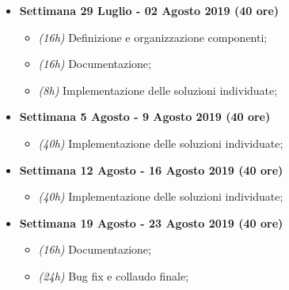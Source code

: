 {\begin{itemize}
\begin{itemize}
        \end{itemize}
        \item \textbf{Settimana \textbf{29 Luglio - 02 Agosto 2019} (40 ore)} 
        \begin{itemize}
            \item \textit{(16h)} Definizione e organizzazione componenti;
            \item \textit{(16h)} Documentazione;
            \item \textit{(8h)} Implementazione delle soluzioni individuate;
        \end{itemize}
        \item \textbf{Settimana \textbf{5 Agosto - 9 Agosto 2019} (40 ore)} 
        \begin{itemize}
            \item \textit{(40h)} Implementazione delle soluzioni individuate;
        \end{itemize}
        \item \textbf{Settimana \textbf{12 Agosto - 16 Agosto 2019} (40 ore)} 
        \begin{itemize}
            \item \textit{(40h)} Implementazione delle soluzioni individuate;
        \end{itemize}
        \item \textbf{Settimana \textbf{19 Agosto - 23 Agosto 2019} (40 ore)} 
        \begin{itemize}
            \item \textit{(16h)} Documentazione;
            \item \textit{(24h)} Bug fix e collaudo finale;
        \end{itemize}
    \end{itemize}
}

\newcommand{\totaleOre}{320}

\newcommand{\obiettiviObbligatori}{
	 \item \underline{\textit{O01}}: Realizzazione del componente "Hydrogen Custom Logon" per \textit{MacOs Mojave};
	 \item \underline{\textit{O02}}: Realizzazione di un installer del componente per \textit{MacOs Mojave};
	 \item \underline{\textit{O03}}: Documentazione di progetto;
	 
}

\newcommand{\obiettiviDesiderabili}{
	 \item \underline{\textit{D01}}: Manuale utente EN;
	 \item \underline{\textit{D02}}: Manuale utente IT;
	 \item \underline{\textit{D03}}: Implementazione della modalità di installazione silenziosa per l'installer del componente per \textit{MacOs Mojave};
}

\newcommand{\obiettiviFacoltativi}{
	 \item \underline{\textit{F01}}: Realizzazione del componente "Hydrogen Custom Logon" per versioni vecchie di \textit{MacOs};
	 \item \underline{\textit{F02}}: Realizzazione di un installer per il componente per versioni vecchie di \textit{MacOs};
}